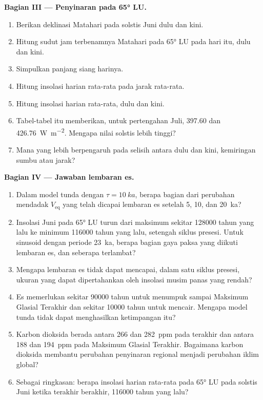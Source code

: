 \begin{problem}
\medskip\noindent\textbf{Bagian III --- Penyinaran pada \ang{65} LU.}
\begin{enumerate}[resume]
  \item Berikan deklinasi Matahari pada solstis Juni dulu dan kini.
  \item Hitung sudut jam terbenamnya Matahari pada \ang{65} LU pada hari itu, dulu dan kini.
  \item Simpulkan panjang siang harinya.
  \item Hitung insolasi harian rata-rata pada jarak rata-rata.
  \item Hitung insolasi harian rata-rata, dulu dan kini.
  \item Tabel-tabel itu memberikan, untuk pertengahan Juli, 397.60 dan \qty{426.76}{W.m^{-2}}. Mengapa nilai
        solstis lebih tinggi?
  \item Mana yang lebih berpengaruh pada selisih antara dulu dan kini, kemiringan sumbu atau jarak?
\end{enumerate}

\medskip\noindent\textbf{Bagian IV --- Jawaban lembaran es.}
\begin{enumerate}[resume]
  \item Dalam model tunda dengan $\tau = \qty{10}{ka}$, berapa bagian dari perubahan mendadak
        $V_{\mathrm{eq}}$ yang telah dicapai lembaran es setelah 5, 10, dan \qty{20}{ka}?
  \item Insolasi Juni pada \ang{65} LU turun dari maksimum sekitar \num{128000} tahun yang lalu ke
        minimum \num{116000} tahun yang lalu, setengah siklus presesi. Untuk sinusoid dengan periode
        \qty{23}{ka}, berapa bagian gaya paksa yang diikuti lembaran es, dan seberapa terlambat?
  \item Mengapa lembaran es tidak dapat mencapai, dalam satu siklus presesi, ukuran yang dapat dipertahankan oleh insolasi
        musim panas yang rendah?
  \item Es memerlukan sekitar \num{90000} tahun untuk menumpuk sampai Maksimum Glasial Terakhir dan sekitar
        \num{10000} tahun untuk mencair. Mengapa model tunda tidak dapat menghasilkan ketimpangan itu?
  \item Karbon dioksida berada antara 266 dan \qty{282}{ppm} pada  terakhir dan antara
        188 dan \qty{194}{ppm} pada Maksimum Glasial Terakhir. Bagaimana karbon dioksida membantu perubahan
        penyinaran regional menjadi perubahan iklim global?
  \item Sebagai ringkasan: berapa insolasi harian rata-rata pada \ang{65} LU pada solstis Juni ketika
         terakhir berakhir, \num{116000} tahun yang lalu?
\end{enumerate}
\end{problem}
